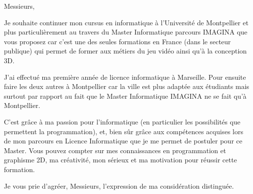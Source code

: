 \documentclass[11pt,origdate]{lettre}
\begin{document}
\begin{letter}
		\opening{Messieurs,}
		
		\par Je souhaite continuer mon cursus en informatique à l'Université de Montpellier et plus particulièrement au travers du Master Informatique parcours IMAGINA que vous proposez car c'est une des seules formations en France (dans le secteur publique) qui permet de former aux métiers du jeu vidéo ainsi qu'à la conception 3D.

	    \par J'ai effectué ma première année de licence informatique à Marseille. Pour ensuite faire les deux autres à Montpellier car la ville est plus adaptée aux étudiants mais surtout par rapport au fait que le Master Informatique IMAGINA ne se fait qu'à Montpellier.

		\par C'est grâce à ma passion pour l'informatique (en particulier les possibilités que permettent la programmation), et, bien sûr grâce aux compétences acquises lors de mon parcours en Licence Informatique que je me permet de postuler pour ce Master. Vous pouvez compter sur mes connaissances en programmation et graphisme 2D, ma créativité, mon sérieux et ma motivation pour réussir cette formation.
		
		\closing{Je vous prie d'agréer, Messieurs, l'expression de ma considération distinguée.}

	\end{letter}
\end{document}
